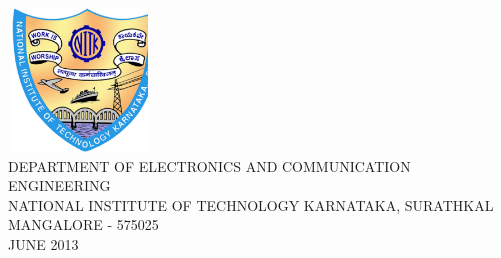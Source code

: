 \documentclass[a4paper,12pt]{report}
\begin{document}
\begin{titlepage}
\begin{center}
\includegraphics*[height=1.5in,width=1.5in]{./figures/nitk_logo.ps}\\
\vspace{1.3cm}
\MakeUppercase{{\large Department of Electronics and Communication Engineering}}\\
\vspace{0.2cm}
\MakeUppercase{{\large National Institute of Technology Karnataka, Surathkal}}\\
\vspace{0.2cm}
\MakeUppercase{{\large Mangalore - 575025}}\\
\vspace{.2cm}
\MakeUppercase{{\large June 2013}}\\
\end{center}
\end{titlepage}

\newpage
\thispagestyle{empty}

\newpage
\thispagestyle{empty}

\newpage
{}
\pagestyle{plain}
\newpage
\pagestyle{plain}


\newpage
\tableofcontents 
{}

\newpage
\listoffigures
{}
\end{document}
